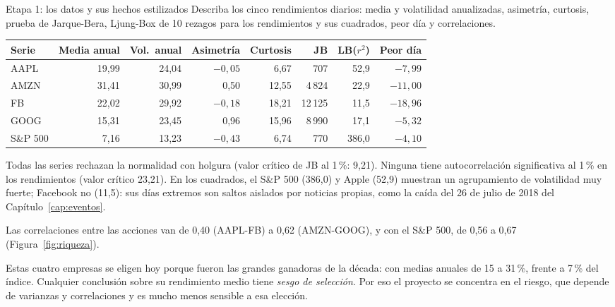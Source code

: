 \begin{ejresuelto}{Etapa 1: los datos y sus hechos estilizados}\label{ej:etapa1}
\enunciado Describa los cinco rendimientos diarios: media y volatilidad anualizadas, asimetría, curtosis, prueba de Jarque-Bera,
Ljung-Box de 10 rezagos para los rendimientos y sus cuadrados, peor día y correlaciones.

\solucion
{}
\begin{center}\small
\begin{tabular}{@{}lrrrrrrr@{}}
\toprule
Serie & Media anual & Vol.\ anual & Asimetría & Curtosis & JB & LB($r^2$) & Peor día \\
\midrule
AAPL & 19,99 & 24,04 & $-0{,}05$ & 6,67 & 707 & 52,9 & $-7{,}99$ \\
AMZN & 31,41 & 30,99 & 0,50 & 12,55 & 4\,824 & 22,9 & $-11{,}00$ \\
FB & 22,02 & 29,92 & $-0{,}18$ & 18,21 & 12\,125 & 11,5 & $-18{,}96$ \\
GOOG & 15,31 & 23,45 & 0,96 & 15,96 & 8\,990 & 17,1 & $-5{,}32$ \\
S\&P 500 & 7,16 & 13,23 & $-0{,}43$ & 6,74 & 770 & 386,0 & $-4{,}10$ \\
\bottomrule
\end{tabular}
\end{center}
Todas las series rechazan la normalidad con holgura (valor crítico de JB al 1\,\%: 9,21). Ninguna tiene autocorrelación significativa al 1\,\% en los
rendimientos (valor crítico 23,21). En los cuadrados, el S\&P 500 (386,0) y Apple (52,9) muestran un agrupamiento de volatilidad muy fuerte; Facebook
no (11,5): sus días extremos son saltos aislados por noticias propias, como la caída del 26 de julio de 2018 del Capítulo~\ref{cap:eventos}.

 Las correlaciones entre las acciones van de 0,40 (AAPL-FB) a 0,62 (AMZN-GOOG), y con el S\&P 500, de 0,56 a 0,67
(Figura~\ref{fig:riqueza}).

 Estas cuatro empresas se eligen hoy porque fueron las grandes ganadoras de la década: con
medias anuales de 15 a 31\,\%, frente a 7\,\% del índice. Cualquier conclusión sobre su rendimiento medio tiene \emph{sesgo de selección}. Por eso
el proyecto se concentra en el riesgo, que depende de varianzas y correlaciones y es mucho menos sensible a esa elección.



\end{ejresuelto}
